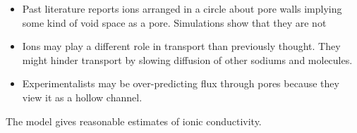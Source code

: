 \documentclass{article}
\begin{document}
	\begin{itemize}
		\item Past literature reports ions arranged in a circle about pore walls implying some kind of void space as a pore. Simulations show that they are not
		\item Ions may play a different role in transport than previously thought. They might hinder transport by slowing diffusion of other sodiums and molecules.
		\item  Experimentalists may be over-predicting flux through pores because they view it as a hollow channel.
        \end{itemize}	
	The model gives reasonable estimates of ionic conductivity.
\end{document}
